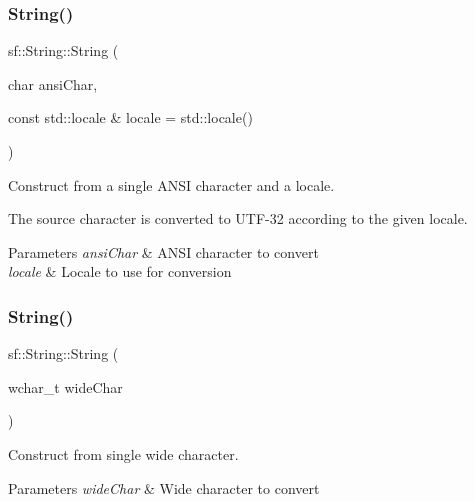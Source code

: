 \subsubsection{\texorpdfstring{String()}{String()}\hspace{0.1cm}{\footnotesize\ttfamily [2/11]}}
{\footnotesize\ttfamily sf\+::\+String\+::\+String (\begin{DoxyParamCaption}\item[{char}]{ansi\+Char,  }\item[{const std\+::locale \&}]{locale = {\ttfamily std\+:\+:locale()} }\end{DoxyParamCaption})}



Construct from a single A\+N\+SI character and a locale. 

The source character is converted to U\+T\+F-\/32 according to the given locale.


\begin{DoxyParams}{Parameters}
{\em ansi\+Char} & A\+N\+SI character to convert \\
\hline
{\em locale} & Locale to use for conversion \\
\hline
\end{DoxyParams}
\mbox{\label{classsf_1_1_string_aefaa202d2aa5ff85b4f75a5983367e86}} 
\subsubsection{\texorpdfstring{String()}{String()}\hspace{0.1cm}{\footnotesize\ttfamily [3/11]}}
{\footnotesize\ttfamily sf\+::\+String\+::\+String (\begin{DoxyParamCaption}\item[{wchar\+\_\+t}]{wide\+Char }\end{DoxyParamCaption})}



Construct from single wide character. 


\begin{DoxyParams}{Parameters}
{\em wide\+Char} & Wide character to convert \\
\hline
\end{DoxyParams}
\mbox{\label{classsf_1_1_string_a8e1a5027416d121187908e2ed77079ff}} 
